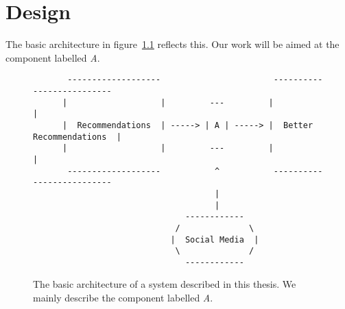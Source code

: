 
\chapter{Design} %

\label{Chapter4} %



% 
% 

The basic architecture in figure~\ref{fig:1_basic_architecture} reflects this. Our work will be aimed at the component labelled \emph{A}.

\begin{figure}[h]
  \centering
    \begin{verbatim}
       -------------------                       --------------------------
      |                   |         ---         |                          |
      |  Recommendations  | -----> | A | -----> |  Better Recommendations  |
      |                   |         ---         |                          |
       -------------------           ^           --------------------------
                                     |
                                     |
                               ------------
                             /              \
                            |  Social Media  |
                             \              /
                               ------------
    \end{verbatim}
  \caption{The basic architecture of a system described in this thesis. We mainly describe the component labelled \emph{A}.}
  \label{fig:1_basic_architecture}
\end{figure}

